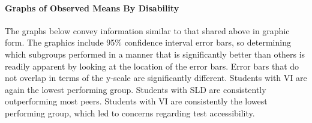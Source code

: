 \documentclass[]{article}
\let\oldparagraph\paragraph
\renewcommand{\paragraph}[1]{\oldparagraph{#1}\mbox{}}
\begin{document}
\clearpage

\paragraph{Graphs of Observed Means By
Disability}\label{graphs-of-observed-means-by-disability}

The graphs below convey information similar to that shared above in
graphic form. The graphics include 95\% confidence interval error bars,
so determining which subgroups performed in a manner that is
significantly better than others is readily apparent by looking at the
location of the error bars. Error bars that do not overlap in terms of
the y-scale are significantly different. Students with VI are again the
lowest performing group. Students with SLD are consistently
outperforming most peers. Students with VI are consistently the lowest
performing group, which led to concerns regarding test accessibility.
\FloatBarrier
\end{document}

